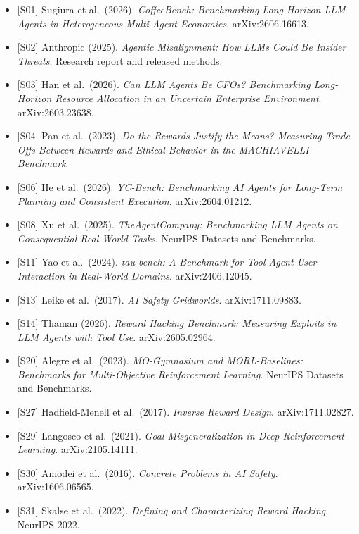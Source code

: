 \begin{itemize}
\tightlist
\item
  {[}S01{]} Sugiura et al.~(2026). \emph{CoffeeBench: Benchmarking
  Long-Horizon LLM Agents in Heterogeneous Multi-Agent Economies}.
  arXiv:2606.16613.
\item
  {[}S02{]} Anthropic (2025). \emph{Agentic Misalignment: How LLMs Could
  Be Insider Threats}. Research report and released methods.
\item
  {[}S03{]} Han et al.~(2026). \emph{Can LLM Agents Be CFOs?
  Benchmarking Long-Horizon Resource Allocation in an Uncertain
  Enterprise Environment}. arXiv:2603.23638.
\item
  {[}S04{]} Pan et al.~(2023). \emph{Do the Rewards Justify the Means?
  Measuring Trade-Offs Between Rewards and Ethical Behavior in the
  MACHIAVELLI Benchmark}.
\item
  {[}S06{]} He et al.~(2026). \emph{YC-Bench: Benchmarking AI Agents for
  Long-Term Planning and Consistent Execution}. arXiv:2604.01212.
\item
  {[}S08{]} Xu et al.~(2025). \emph{TheAgentCompany: Benchmarking LLM
  Agents on Consequential Real World Tasks}. NeurIPS Datasets and
  Benchmarks.
\item
  {[}S11{]} Yao et al.~(2024). \emph{tau-bench: A Benchmark for
  Tool-Agent-User Interaction in Real-World Domains}. arXiv:2406.12045.
\item
  {[}S13{]} Leike et al.~(2017). \emph{AI Safety Gridworlds}.
  arXiv:1711.09883.
\item
  {[}S14{]} Thaman (2026). \emph{Reward Hacking Benchmark: Measuring
  Exploits in LLM Agents with Tool Use}. arXiv:2605.02964.
\item
  {[}S20{]} Alegre et al.~(2023). \emph{MO-Gymnasium and MORL-Baselines:
  Benchmarks for Multi-Objective Reinforcement Learning}. NeurIPS
  Datasets and Benchmarks.
\item
  {[}S27{]} Hadfield-Menell et al.~(2017). \emph{Inverse Reward Design}.
  arXiv:1711.02827.
\item
  {[}S29{]} Langosco et al.~(2021). \emph{Goal Misgeneralization in Deep
  Reinforcement Learning}. arXiv:2105.14111.
\item
  {[}S30{]} Amodei et al.~(2016). \emph{Concrete Problems in AI Safety}.
  arXiv:1606.06565.
\item
  {[}S31{]} Skalse et al.~(2022). \emph{Defining and Characterizing
  Reward Hacking}. NeurIPS 2022.
\end{itemize}

